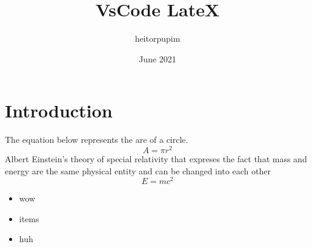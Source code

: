 \documentclass{article}
\title{VsCode LateX}
\author{heitorpupim}
\date{June 2021}
\begin{document}
\maketitle

\section{Introduction}
The equation below represents the are of a circle.
\begin{equation}
    A = \pi r^2
\end{equation}
Albert Einstein's theory of special relativity that expreses the fact that mass and energy are the same physical entity and can be changed into each other
\begin{equation}
    E = mc^2
\end{equation}
\begin{itemize}
    \item wow
    \item items
    \item huh
\end{itemize}
\end{document}
